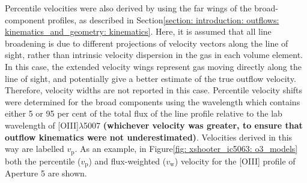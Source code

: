 Percentile velocities were also derived by using the far wings of the broad-component profiles, as described in Section\;\ref{section: introduction: outflows: kinematics_and_geometry: kinematics}. Here, it is assumed that all line broadening is due to different projections of velocity vectors along the line of sight, rather than intrinsic velocity dispersion in the gas in each volume element. In this case, the extended velocity wings represent gas moving directly along the line of sight, and potentially give a better estimate of the true outflow velocity. Therefore, velocity widths are not reported in this case. Percentile velocity shifts were determined for the broad components using the wavelength which contains either 5 or 95 per cent of the total flux of the line profile relative to the lab wavelength of [OIII]$\lambda$5007 \textbf{(whichever velocity was greater, to ensure that outflow kinematics were not underestimated)}. Velocities derived in this way are labelled $v_\mathrm{p}$. As an example, in Figure\;\ref{fig: xshooter_ic5063: o3_models} both the percentile ($v_\mathrm{p}$) and flux-weighted ($v_\mathrm{w}$) velocity for the [OIII] profile of Aperture 5 are shown.

